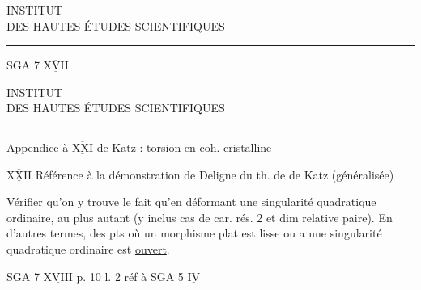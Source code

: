 \begin{center}
INSTITUT\\
DES HAUTES ÉTUDES SCIENTIFIQUES\\[-.3ex]
\rule{1.3cm}{.4pt}
\end{center}

SGA 7 $\underline{\overline{\mathrm{XVII}}}$


\begin{center}
INSTITUT\\
DES HAUTES ÉTUDES SCIENTIFIQUES\\[-.3ex]
\rule{1.3cm}{.4pt}
\end{center}

Appendice à $\underline{\overline{\mathrm{XXI}}}$ de Katz : torsion en coh. cristalline

$\underline{\overline{\mathrm{XXII}}}$ \quad Référence à la démonstration de Deligne du th. de  de Katz (généralisée)

{\reversemarginpar{}}Vérifier qu'on y trouve le fait qu'en déformant une singularité quadratique ordinaire,  au plus autant (y inclus cas de car. rés. 2 et dim relative paire). En d'autres termes,  des pts où un morphisme plat   est lisse ou a une singularité quadratique ordinaire est  \uline{ouvert}.

SGA 7 $\underline{\overline{\mathrm{XVIII}}}$ \qquad p. 10 l. 2 réf à  SGA 5 $\underline{\overline{\mathrm{IV}}}$

